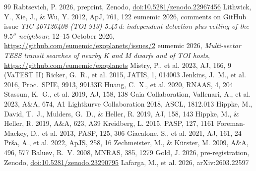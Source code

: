 \documentclass[11pt]{article}
\begin{document}
\begin{thebibliography}{99}\small
{} Rabtsevich, P. 2026, preprint, Zenodo, \href{https://doi.org/10.5281/zenodo.22967456}{doi:10.5281/zenodo.22967456}
 Lithwick, Y., Xie, J., \& Wu, Y. 2012, ApJ, 761, 122
 eumemic 2026, comments on GitHub issue \emph{TIC 407126408 (TOI-913) 5.45\,d: independent detection plus vetting of the $9.5''$ neighbour}, 12--15 October 2026, \url{https://github.com/eumemic/exoplanets/issues/2}
 eumemic 2026, \emph{Multi-sector TESS transit searches of nearby K and M dwarfs and of TOI hosts}, \url{https://github.com/eumemic/exoplanets}
 Mistry, P., et al. 2023, AJ, 166, 9 (VaTEST II)
 Ricker, G.~R., et al. 2015, JATIS, 1, 014003
 Jenkins, J.~M., et al. 2016, Proc.\ SPIE, 9913, 99133E
 Huang, C.~X., et al. 2020, RNAAS, 4, 204
 Stassun, K.~G., et al. 2019, AJ, 158, 138
 Gaia Collaboration, Vallenari, A., et al. 2023, A\&A, 674, A1
 Lightkurve Collaboration 2018, ASCL, 1812.013
 Hippke, M., David, T.~J., Mulders, G.~D., \& Heller, R. 2019, AJ, 158, 143
 Hippke, M., \& Heller, R. 2019, A\&A, 623, A39
 Kreidberg, L. 2015, PASP, 127, 1161
 Foreman-Mackey, D., et al. 2013, PASP, 125, 306
 Giacalone, S., et al. 2021, AJ, 161, 24
 Pr\v{s}a, A., et al. 2022, ApJS, 258, 16
 Zechmeister, M., \& K\"urster, M. 2009, A\&A, 496, 577
 Baluev, R.~V. 2008, MNRAS, 385, 1279
 Gold, J. 2026, pre-registration, Zenodo, \href{https://doi.org/10.5281/zenodo.23290795}{doi:10.5281/zenodo.23290795}
 Lafarga, M., et al. 2026, arXiv:2603.22597
\end{thebibliography}
\end{document}
